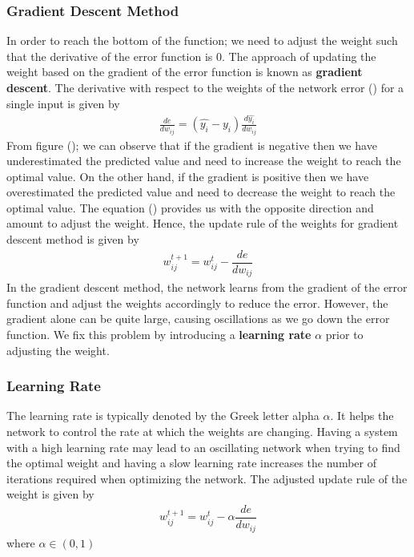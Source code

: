 \subsubsection{Gradient Descent Method}
In order to reach the bottom of the function; we need to adjust the weight such that the derivative of the error function is 0. The approach of updating the weight based on the gradient of the error function is known as \textbf{gradient descent}. The derivative with respect to the weights of the network error () for a single input is given by
\begin{align}
  \frac{de}{dw_{ij}} = (\widehat{y_i}-y_i)\frac{d\widehat{y_i}}{dw_{ij}}
  \label{derivative_network_error}
\end{align}
From figure (); we can observe that if the gradient is negative then we have underestimated the predicted value and need to increase the weight to reach the optimal value. On the other hand, if the gradient is positive then we have overestimated the predicted value and need to decrease the weight to reach the optimal value. The equation () provides us with the opposite direction and amount to adjust the weight. Hence, the update rule of the weights for gradient descent method is given by
\begin{align}
  w_{ij}^{t+1} = w_{ij}^{t} - \dfrac{de}{dw_{ij}}
\end{align}
In the gradient descent method, the network learns from the gradient of the error function and adjust the weights accordingly to reduce the error. However, the gradient alone can be quite large, causing oscillations as we go down the error function. We fix this problem by introducing a \textbf{learning rate} $\alpha$ prior to adjusting the weight.
\subsubsection{Learning Rate}
The learning rate is typically denoted by the Greek letter alpha $\alpha$. It helps the network to control the rate at which the weights are changing. Having a system with a high learning rate may lead to an oscillating network when trying to find the optimal weight and having a slow learning rate increases the number of iterations required when optimizing the network. The adjusted update rule of the weight is given by
\begin{align}
  w_{ij}^{t+1} = w_{ij}^{t} - \alpha\dfrac{de}{dw_{ij}}
\end{align}
where $\alpha \in (0,1)$
